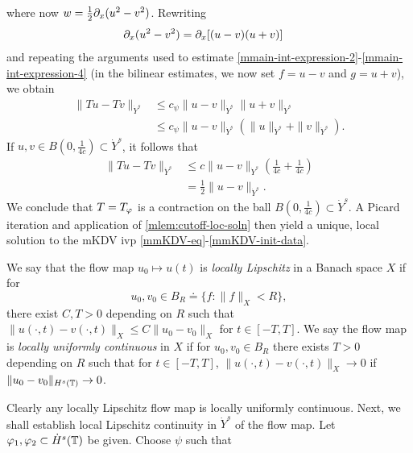 %
where now $w = \frac{1}{2} \partial_x (u^2 - v^2)$. Rewriting
%
\begin{equation*}
	\begin{split}
	\partial_x(u^2 - v^2)	
		& = \partial_x[(u-v)(u+v)]
		\end{split}
\end{equation*}
%
and repeating the arguments used to estimate 
\eqref{mmain-int-expression-2}-\eqref{mmain-int-expression-4} (in the
bilinear estimates, we now set $f=u-v$ and $g = u+v$), we obtain
%
\begin{equation}
	\label{m20a}
	\begin{split}
		\|Tu - Tv \|_{\dot{Y}^s}  
		& \le c_\psi \|u -v\|_{\dot{Y}^s} \|u + v \|_{\dot{Y}^s}
		\\
		& \le c_\psi \|u -v\|_{\dot{Y}^s} (\|u\|_{\dot{Y}^s}+ \|v \|_{\dot{Y}^s}).
	\end{split}
\end{equation}
%
If $u, v \in B(0, \frac{1}{4c}) \subset \dot{Y}^s$, it follows that
%
\begin{equation}
	\label{m21a}
	\begin{split}
		\|Tu - Tv \|_{\dot{Y}^s}
		& \le c \|u -v \|_{\dot{Y}^s} \left( \frac{1}{4c} + 
		\frac{1}{4c} \right)
		\\
		& = \frac{1}{2} \|u -v \|_{\dot{Y}^s}. 
	\end{split}
\end{equation}
%
We conclude that $T = T_{\varphi}$ is a contraction on the ball $B(0, 
\frac{1}{4c}) \subset \dot{Y}^s$. A Picard iteration and application of 
\cref{mlem:cutoff-loc-soln} then yield a unique, local
solution to the mKDV ivp \eqref{mmKDV-eq}-\eqref{mmKDV-init-data}.
\begin{definition}
	We say that the flow map $u_0 \mapsto u(t)$ is \emph{locally Lipschitz} in a Banach
	space $X$ if for
	$$u_0, v_0 \in B_R \doteq \{f: \|f\|_X < R\},$$ there exist $C, T>0$
	depending on $R$ such that $\|u(\cdot, t) - v(\cdot, t)
	\|_X \le C \|u_{0} - v_0 \|_{X}$ for $t \in [-T, T]$. We
	say the flow map is \emph{locally uniformly
	continuous} in $X$ if for
	$u_0, v_0 \in B_R$ there exists $T >0$ depending on $R$ such that for
	$t \in [-T, T]$, $\|u(\cdot, t) - v(\cdot, t) \|_{X} \to
	0$ if $\|u_0 - v_0 \|_{H^{s}(\mathbb{T})} \to 0$. 
\end{definition}
%
%
Clearly any locally Lipschitz flow map is locally uniformly continuous. 
Next, we shall establish local Lipschitz continuity in $\dot{Y}^s$ of the flow
map. Let $\varphi_1, \varphi_2 \subset \dot{H}^s(\mathbb{T})$ be given. Choose $\psi$ such that
